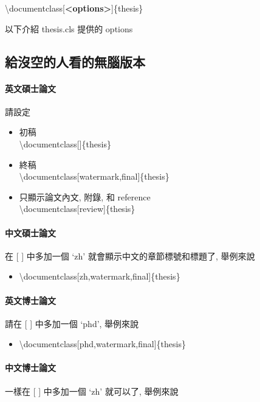 \textbackslash documentclass[\textbf{<options>}]\{thesis\}

以下介紹 thesis.cls 提供的 options

\newpage

\subsection{給沒空的人看的無腦版本}

\paragraph{英文碩士論文} 請設定

\begin{itemize}
\item 初稿\\
\textbackslash documentclass[]\{thesis\}
\item 終稿\\
\textbackslash documentclass[watermark,final]\{thesis\}
\item 只顯示論文內文, 附錄, 和 reference\\
\textbackslash documentclass[review]\{thesis\}
\end{itemize}

\paragraph{中文碩士論文} 在 [ ] 中多加一個 `zh' 就會顯示中文的章節標號和標題了, 舉例來說

\begin{itemize}
\item \textbackslash documentclass[zh,watermark,final]\{thesis\}
\end{itemize}


\paragraph{英文博士論文} 請在 [ ] 中多加一個 `phd', 舉例來說

\begin{itemize}
\item \textbackslash documentclass[phd,watermark,final]\{thesis\}
\end{itemize}

\paragraph{中文博士論文} 一樣在 [ ] 中多加一個 `zh' 就可以了, 舉例來說

